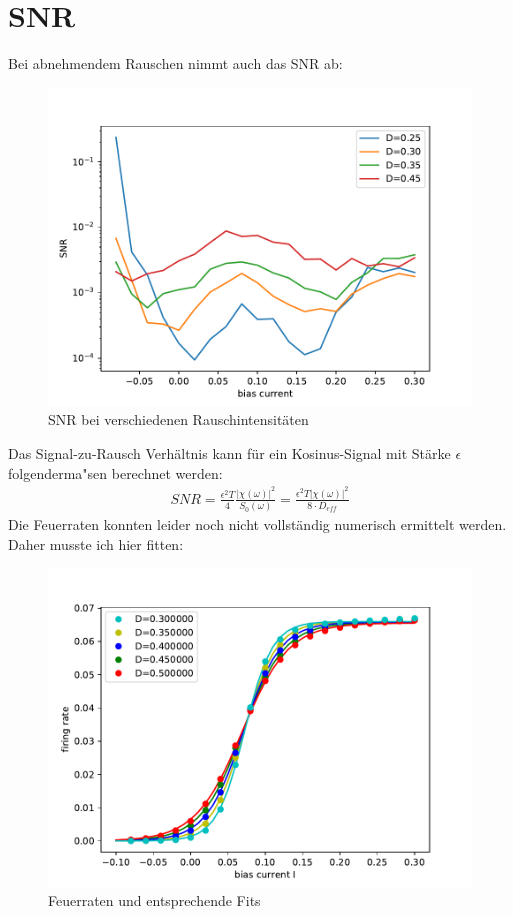 \documentclass[12pt,a4paper]{article}
\begin{document}

\thispagestyle{empty}
\newpage
\tableofcontents
\thispagestyle{empty}
\newpage
{}

\section{SNR}
Bei abnehmendem Rauschen nimmt auch das SNR ab:

\begin{figure}[H]
	\centering
	\includegraphics[scale=0.9]{snrautoreal13a25.pdf}
	\caption{SNR bei verschiedenen Rauschintensitäten}
	\label{snrnoise}
\end{figure}
Das Signal-zu-Rausch Verhältnis kann für ein Kosinus-Signal mit Stärke $\epsilon$ folgenderma"sen berechnet werden:
\begin{align*}
SNR=\frac{\epsilon ^2T}{4}\frac{|\chi(\omega)|^2}{S_0(\omega)}=\frac{\epsilon^2T|\chi(\omega)|^2}{8\cdot D_{eff}}
\end{align*}
Die Feuerraten konnten leider noch nicht vollständig numerisch ermittelt werden. Daher musste ich hier fitten:
\begin{figure}[H]
	\centering
	\includegraphics[scale=0.9]{gana.pdf}
	\caption{Feuerraten und entsprechende Fits}
	\label{feuerrate}
\end{figure}
\end{document}
